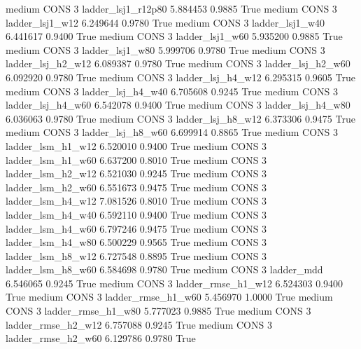     medium     CONS                 3     ladder_lsj1_r12p80   5.884453      0.9885    True
    medium     CONS                 3        ladder_lsj1_w12   6.249644      0.9780    True
    medium     CONS                 3        ladder_lsj1_w40   6.441617      0.9400    True
    medium     CONS                 3        ladder_lsj1_w60   5.935200      0.9885    True
    medium     CONS                 3        ladder_lsj1_w80   5.999706      0.9780    True
    medium     CONS                 3      ladder_lsj_h2_w12   6.089387      0.9780    True
    medium     CONS                 3      ladder_lsj_h2_w60   6.092920      0.9780    True
    medium     CONS                 3      ladder_lsj_h4_w12   6.295315      0.9605    True
    medium     CONS                 3      ladder_lsj_h4_w40   6.705608      0.9245    True
    medium     CONS                 3      ladder_lsj_h4_w60   6.542078      0.9400    True
    medium     CONS                 3      ladder_lsj_h4_w80   6.036063      0.9780    True
    medium     CONS                 3      ladder_lsj_h8_w12   6.373306      0.9475    True
    medium     CONS                 3      ladder_lsj_h8_w60   6.699914      0.8865    True
    medium     CONS                 3      ladder_lsm_h1_w12   6.520010      0.9400    True
    medium     CONS                 3      ladder_lsm_h1_w60   6.637200      0.8010    True
    medium     CONS                 3      ladder_lsm_h2_w12   6.521030      0.9245    True
    medium     CONS                 3      ladder_lsm_h2_w60   6.551673      0.9475    True
    medium     CONS                 3      ladder_lsm_h4_w12   7.081526      0.8010    True
    medium     CONS                 3      ladder_lsm_h4_w40   6.592110      0.9400    True
    medium     CONS                 3      ladder_lsm_h4_w60   6.797246      0.9475    True
    medium     CONS                 3      ladder_lsm_h4_w80   6.500229      0.9565    True
    medium     CONS                 3      ladder_lsm_h8_w12   6.727548      0.8895    True
    medium     CONS                 3      ladder_lsm_h8_w60   6.584698      0.9780    True
    medium     CONS                 3             ladder_mdd   6.546065      0.9245    True
    medium     CONS                 3     ladder_rmse_h1_w12   6.524303      0.9400    True
    medium     CONS                 3     ladder_rmse_h1_w60   5.456970      1.0000    True
    medium     CONS                 3     ladder_rmse_h1_w80   5.777023      0.9885    True
    medium     CONS                 3     ladder_rmse_h2_w12   6.757088      0.9245    True
    medium     CONS                 3     ladder_rmse_h2_w60   6.129786      0.9780    True
